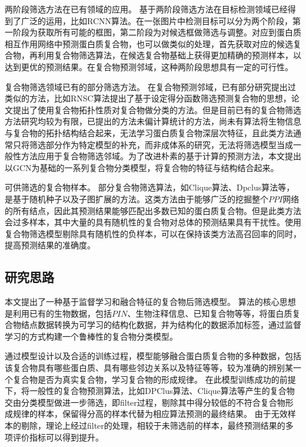 两阶段筛选方法在已有领域的应用。
基于两阶段筛选方法在目标检测领域已经得到了广泛的运用，比如RCNN算法\cite{girshick_rich_2014}。在一张图片中检测目标可以分为两个阶段，第一阶段为获取所有可能的框图，第二阶段为对候选框做筛选与调整。对应到蛋白质相互作用网络中预测蛋白质复合物，也可以做类似的处理，首先获取对应的候选复合物，再利用复合物筛选算法，在候选复合物基础上获得更加精确的预测样本，以达到更优的预测结果。在复合物预测邻域，这种两阶段思想具有一定的可行性。

复合物筛选领域已有的部分筛选方法。
在复合物预测邻域，已有部分研究提出过类似的方法，比如RNSC算法\cite{king_protein_2004}提出了基于设定得分函数筛选预测复合物的思想，论文\cite{yu_predicting_2014}提出了使用复合物拓扑性质对复合物做分类的方法。但是目前已有的复合物筛选方法研究均较为有限，已提出的方法未偏计算统计的方法，尚未有算法将生物信息与复合物的拓扑结构结合起来，无法学习蛋白质复合物深层次特征，且此类方法通常只将筛选部分作为特定模型的补充，而非成体系的研究，无法将筛选模型当成一般性方法应用于复合物筛选邻域。为了改进朴素的基于计算的预测方法，本文提出以GCN为基础的一系列复合物分类模型，将复合物的特征与结构结合起来。

可供筛选的复合物样本。
部分复合物筛选算法，如Clique算法\cite{spirin_protein_2003}、Dpclus算法等，是基于随机种子以及子图扩展的方法。这类方法由于能够广泛的挖掘整个$PPI$网络的所有结点，因此其预测结果能够匹配出多数已知的蛋白质复合物。但是此类方法会过多样本，其中大量的具有随机性的复合物对总体的预测结果具有干扰性。使用复合物筛选模型剔除具有随机性的负样本，可以在保持该类方法高召回率的同时，提高预测结果的准确度。


\subsection{研究思路}
\label{subsection:motivationAndThinking:thinking}

本文提出了一种基于监督学习和融合特征的复合物后筛选模型。
算法的核心思想是利用已有的生物数据，包括$PIN$、生物注释信息、已知复合物等等，将蛋白质复合物结点数据转换为可学习的结构化数据，并为结构化的数据添加标签，通过监督学习的方式构建一个鲁棒性的复合物分类模型。

通过模型设计以及合适的训练过程，模型能够融合蛋白质复合物的多种数据，包括该复合物具有哪些蛋白质、具有哪些邻边关系以及特征等等，较为准确的辨别某一个复合物是否为真实复合物，学习复合物的形成规律。
在此模型训练成功的前提下，将一般性的复合物预测算法，比如DPClus算法\cite{altaf-ul-amin_development_2006}、Clique算法\cite{spirin_protein_2003}等产生的复合物交由分类模型做进一步筛选，即filter过程，剔除其中得分较低的不符合复合物形成规律的样本，保留得分高的样本代替为相应算法预测的最终结果。
由于无效样本的剔除，理论上经过filter的处理，相较于未筛选前的样本，最终预测结果的多项评价指标可以得到提升。

